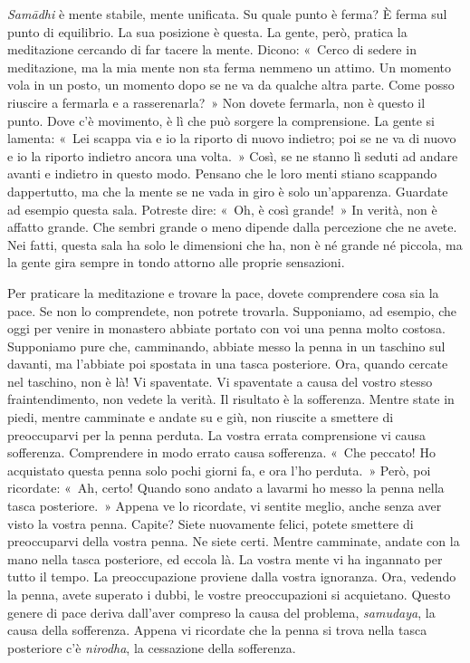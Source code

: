 \emph{Samādhi} è mente stabile, mente unificata. Su quale punto è ferma?
È ferma sul punto di equilibrio. La sua posizione è questa. La gente,
però, pratica la meditazione cercando di far tacere la mente. Dicono:
«~Cerco di sedere in meditazione, ma la mia mente non sta ferma nemmeno
un attimo. Un momento vola in un posto, un momento dopo se ne va da
qualche altra parte. Come posso riuscire a fermarla e a rasserenarla?~»
Non dovete fermarla, non è questo il punto. Dove c'è movimento, è lì che
può sorgere la comprensione. La gente si lamenta: «~Lei scappa via e io
la riporto di nuovo indietro; poi se ne va di nuovo e io la riporto
indietro ancora una volta.~» Così, se ne stanno lì seduti ad andare
avanti e indietro in questo modo. Pensano che le loro menti stiano
scappando dappertutto, ma che la mente se ne vada in giro è solo
un'apparenza. Guardate ad esempio questa sala. Potreste dire: «~Oh, è
così grande!~» In verità, non è affatto grande. Che sembri grande o meno
dipende dalla percezione che ne avete. Nei fatti, questa sala ha solo le
dimensioni che ha, non è né grande né piccola, ma la gente gira sempre
in tondo attorno alle proprie sensazioni.

Per praticare la meditazione e trovare la pace, dovete comprendere cosa
sia la pace. Se non lo comprendete, non potrete trovarla. Supponiamo, ad
esempio, che oggi per venire in monastero abbiate portato con voi una
penna molto costosa. Supponiamo pure che, camminando, abbiate messo la
penna in un taschino sul davanti, ma l'abbiate poi spostata in una tasca
posteriore. Ora, quando cercate nel taschino, non è là! Vi spaventate.
Vi spaventate a causa del vostro stesso fraintendimento, non vedete la
verità. Il risultato è la sofferenza. Mentre state in piedi, mentre
camminate e andate su e giù, non riuscite a smettere di preoccuparvi per
la penna perduta. La vostra errata comprensione vi causa sofferenza.
Comprendere in modo errato causa sofferenza. «~Che peccato! Ho
acquistato questa penna solo pochi giorni fa, e ora l'ho perduta.~»
Però, poi ricordate: «~Ah, certo! Quando sono andato a lavarmi ho messo
la penna nella tasca posteriore.~» Appena ve lo ricordate, vi sentite
meglio, anche senza aver visto la vostra penna. Capite? Siete nuovamente
felici, potete smettere di preoccuparvi della vostra penna. Ne siete
certi. Mentre camminate, andate con la mano nella tasca posteriore, ed
eccola là. La vostra mente vi ha ingannato per tutto il tempo. La
preoccupazione proviene dalla vostra ignoranza. Ora, vedendo la penna,
avete superato i dubbi, le vostre preoccupazioni si acquietano. Questo
genere di pace deriva dall'aver compreso la causa del problema,
\emph{samudaya}, la causa della sofferenza. Appena vi ricordate che la
penna si trova nella tasca posteriore c'è \emph{nirodha}, la cessazione
della sofferenza.

